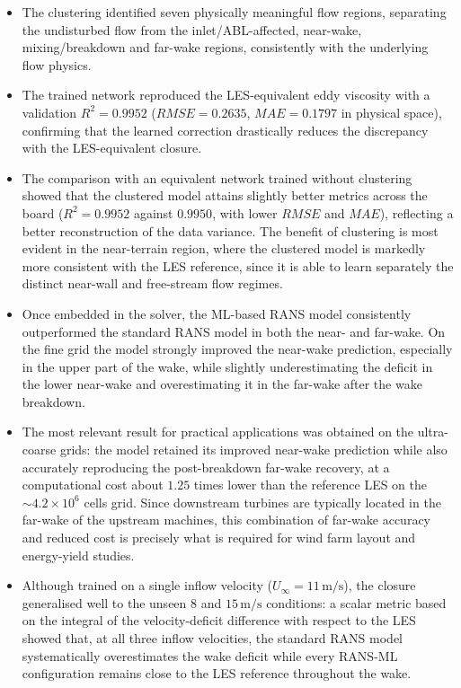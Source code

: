 \begin{itemize}
    \item The clustering identified seven physically meaningful flow
    regions, separating the undisturbed flow from the
    inlet/ABL-affected, near-wake, mixing/breakdown and far-wake regions,
    consistently with the underlying flow physics.

    \item The trained network reproduced the LES-equivalent eddy
    viscosity with a validation $R^2 = 0.9952$
    ($RMSE = 0.2635$, $MAE = 0.1797$ in physical space), confirming that the learned correction drastically
    reduces the discrepancy with the LES-equivalent closure.

    \item The comparison with an equivalent network trained without
    clustering showed that the clustered model attains slightly better
    metrics across the board ($R^2 = 0.9952$ against $0.9950$, with lower
    $RMSE$ and $MAE$), reflecting a better reconstruction of the data
    variance. The benefit of clustering is
    most evident in the near-terrain region, where the clustered model
    is markedly more consistent with the LES reference, since it is able
    to learn separately the distinct near-wall and free-stream flow
    regimes.

    \item Once embedded in the solver, the ML-based RANS model
    consistently outperformed the standard RANS model in both the near-
    and far-wake. On the fine grid the model strongly improved the
    near-wake prediction, especially in the upper part of the wake,
    while slightly underestimating the deficit in the lower near-wake
    and overestimating it in the far-wake after the wake breakdown.

    \item The most relevant result for practical applications was
    obtained on the ultra-coarse grids: the model retained its improved
    near-wake prediction while also accurately reproducing the
    post-breakdown far-wake recovery, at a computational cost about
    $1.25$ times lower than the reference LES on the
    $\sim\!4.2\times10^6$ cells grid. Since downstream turbines are
    typically located in the far-wake of the upstream machines, this
    combination of far-wake accuracy and reduced cost is precisely what
    is required for wind farm layout and energy-yield studies.

    \item Although trained on a single inflow velocity
    ($U_\infty = 11\,\mathrm{m/s}$), the closure generalised well to the
    unseen $8$ and $15\,\mathrm{m/s}$ conditions: a scalar metric based on
    the integral of the velocity-deficit difference with respect to the
    LES showed that, at all three inflow velocities, the standard RANS
    model systematically overestimates the wake deficit while every
    RANS-ML configuration remains close to the LES reference throughout
    the wake.


\end{itemize}
